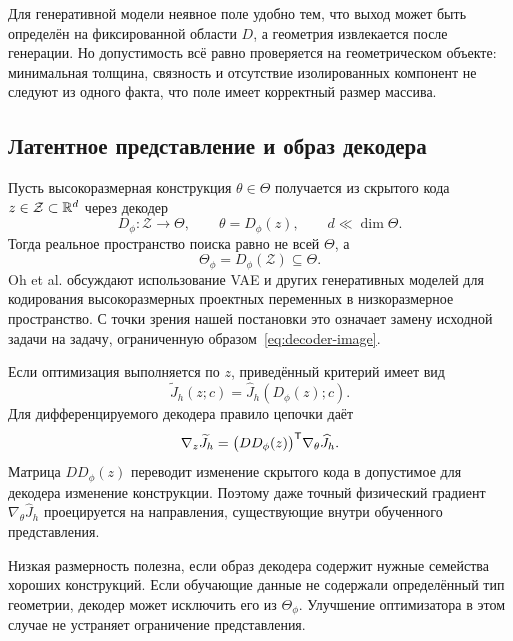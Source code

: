 Для генеративной модели неявное поле удобно тем, что выход может быть определён на фиксированной области $D$, а геометрия извлекается после генерации. Но допустимость всё равно проверяется на геометрическом объекте: минимальная толщина, связность и отсутствие изолированных компонент не следуют из одного факта, что поле имеет корректный размер массива.

\subsection{Латентное представление и образ декодера}

Пусть высокоразмерная конструкция $\theta\in\Theta$ получается из скрытого кода $z\in\mathcal Z\subset\mathbb{R}^d$ через декодер
\begin{equation}
 D_\phi:\mathcal Z\longrightarrow\Theta,
 \qquad
 \theta=D_\phi(z),
 \qquad
 d\ll\dim\Theta.
\end{equation}
Тогда реальное пространство поиска равно не всей $\Theta$, а
\begin{equation}
\label{eq:decoder-image}
 \Theta_\phi
 =
 D_\phi(\mathcal Z)
 \subseteq
 \Theta.
\end{equation}
Oh et al. обсуждают использование VAE и других генеративных моделей для кодирования высокоразмерных проектных переменных в низкоразмерное пространство. С точки зрения нашей постановки это означает замену исходной задачи на задачу, ограниченную образом~\eqref{eq:decoder-image}.

Если оптимизация выполняется по $z$, приведённый критерий имеет вид
\begin{equation}
 \widetilde J_h(z;c)
 =
 \widehat J_h(D_\phi(z);c).
\end{equation}
Для дифференцируемого декодера правило цепочки даёт
\begin{equation}
 \nabla_z\widetilde J_h
 =
 \bigl(DD_\phi(z)\bigr)^{\mathsf{T}}
 \nabla_\theta\widehat J_h.
\end{equation}
Матрица $DD_\phi(z)$ переводит изменение скрытого кода в допустимое для декодера изменение конструкции. Поэтому даже точный физический градиент $\nabla_\theta\widehat J_h$ проецируется на направления, существующие внутри обученного представления.

Низкая размерность полезна, если образ декодера содержит нужные семейства хороших конструкций. Если обучающие данные не содержали определённый тип геометрии, декодер может исключить его из $\Theta_\phi$. Улучшение оптимизатора в этом случае не устраняет ограничение представления.

